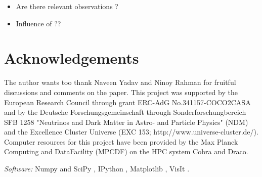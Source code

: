 \documentclass[fleqn,usenatbib]{mnras}
\newcommand{\COM}[1]{{\color{orange}#1}}
\begin{document}
\COM{
\begin{itemize}
    \item Are there relevant observations ?
    \item Influence of \cite{Jones2019} ??
\end{itemize}
}

\section*{Acknowledgements}
The author wants too thank Naveen Yadav and Ninoy Rahman for fruitful discussions and comments on the paper. This project was supported by the European Research Council through grant ERC-AdG No.341157-COCO2CASA and by the Deutsche Forschungsgemeinschaft through Sonderforschungbereich SFB 1258 "Neutrinos and Dark Matter in Astro- and Particle Physics" (NDM) and the Excellence Cluster Universe (EXC 153; http://www.universe-cluster.de/). Computer resources for this project have been provided by  the Max Planck Computing and DataFacility (MPCDF) on the HPC system Cobra and Draco.

\textit{Software:} Numpy and SciPy \citet{Jones2001}, IPython \citet{Perez2007}, Matplotlib \citet{Hunter2007}, VisIt \citet{Childs2012}.



\newpage
\appendix
\end{document}
